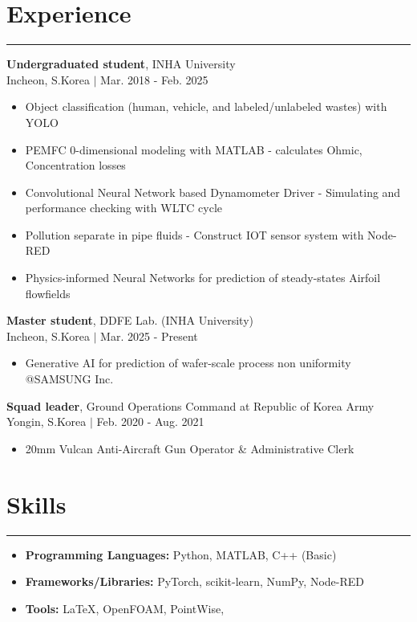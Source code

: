 \documentclass{article} %
\newcommand{\mycventry}[5]{
  \vspace{1.5em} %

  \textbf{#1}, #2 \\ %
  #3 $|$ #4 \\[0.4em] %

  \begin{itemize}[nosep, after=\vspace{-0.4em}] %
    #5 %
  \end{itemize}
}
\newcommand{\sectionsplitrule}{
  \hrule %
  \vspace{1em} %
}
\begin{document}
\section*{Experience}
\sectionsplitrule

\mycventry
  {Undergraduated student} %
  {INHA University} %
  {Incheon, S.Korea} %
  {Mar. 2018 - Feb. 2025} %
  { %
    \item Object classification (human, vehicle, and labeled/unlabeled wastes) with YOLO
	\item PEMFC 0-dimensional modeling with MATLAB - calculates Ohmic, Concentration losses
	\item Convolutional Neural Network based Dynamometer Driver - Simulating and performance checking with WLTC cycle
	\item Pollution separate in pipe fluids - Construct IOT sensor system with Node-RED
    \item Physics-informed Neural Networks for prediction of steady-states Airfoil flowfields
  }

\mycventry
  {Master student} %
  {DDFE Lab. (INHA University)} %
  {Incheon, S.Korea} %
  {Mar. 2025 - Present} %
  { %
    \item Generative AI for prediction of wafer-scale process non uniformity @SAMSUNG Inc.
  }


\mycventry
  {Squad leader} %
  {Ground Operations Command at Republic of Korea Army} %
  {Yongin, S.Korea} %
  {Feb. 2020 - Aug. 2021} %
  {
    \item 20mm Vulcan Anti-Aircraft Gun Operator \& Administrative Clerk
  }

\section*{Skills}
\sectionsplitrule

\begin{itemize}[leftmargin=1.5em, parsep=0.5em] %
    \item \textbf{Programming Languages:} Python, MATLAB, C++ (Basic)
    \item \textbf{Frameworks/Libraries:} PyTorch, scikit-learn, NumPy, Node-RED
    \item \textbf{Tools:} LaTeX, OpenFOAM, PointWise, 
\end{itemize}
\end{document}
